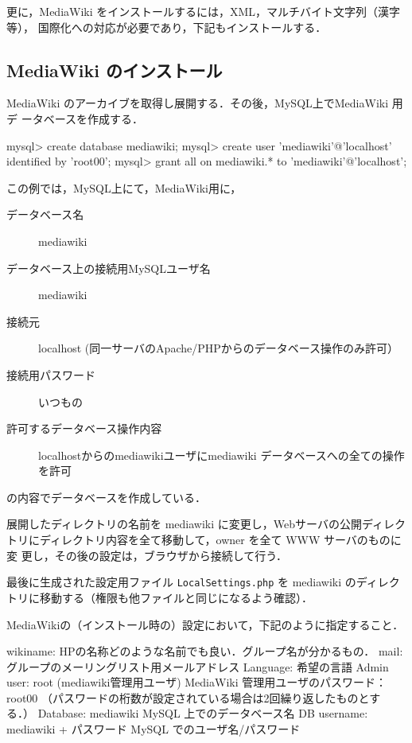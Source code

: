 更に，MediaWiki をインストールするには，XML，マルチバイト文字列（漢字等），
国際化への対応が必要であり，下記もインストールする．


\subsection{MediaWiki のインストール}

MediaWiki のアーカイブを取得し展開する．その後，MySQL上でMediaWiki 用デ
ータベースを作成する．
\begin{cli}
mysql> create database mediawiki;
mysql> create user 'mediawiki'@'localhost' identified by 'root00';
mysql> grant all on mediawiki.* to 'mediawiki'@'localhost';
\end{cli}
この例では，MySQL上にて，MediaWiki用に，
\begin{description}
 \item[データベース名] mediawiki
 \item[データベース上の接続用MySQLユーザ名] mediawiki
 \item[接続元] localhost (同一サーバのApache/PHPからのデータベース操作のみ許可）
 \item[接続用パスワード] いつもの
 \item[許可するデータベース操作内容] localhostからのmediawikiユーザにmediawiki データベースへの全ての操作を許可
\end{description}
の内容でデータベースを作成している．

展開したディレクトリの名前を mediawiki に変更し，Webサーバの公開ディレク
トリにディレクトリ内容を全て移動して，owner を全て WWW サーバのものに変
更し，その後の設定は，ブラウザから接続して行う．

最後に生成された設定用ファイル \texttt{LocalSettings.php} を mediawiki 
のディレクトリに移動する（権限も他ファイルと同じになるよう確認）．

MediaWikiの（インストール時の）設定において，下記のように指定すること．

\begin{cli}
wikiname: HPの名称どのような名前でも良い．グループ名が分かるもの．
mail: グループのメーリングリスト用メールアドレス
Language: 希望の言語
Admin user: root (mediawiki管理用ユーザ)
        MediaWiki 管理用ユーザのパスワード：root00
        （パスワードの桁数が設定されている場合は2回繰り返したものとする．）
Database: mediawiki
        MySQL 上でのデータベース名
DB username: mediawiki
        + パスワード
        MySQL でのユーザ名/パスワード
\end{cli}

